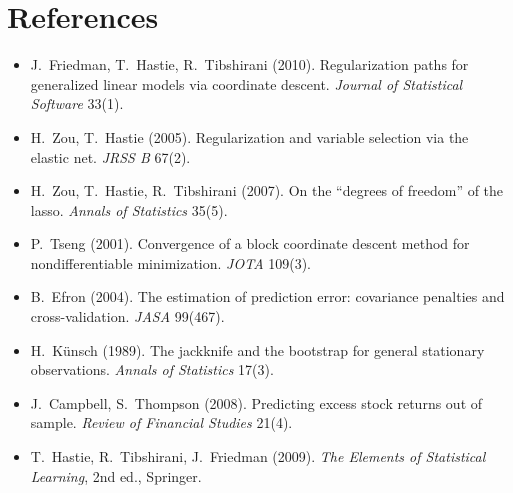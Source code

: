 \section*{References}
\begin{itemize}\small
  \item J.~Friedman, T.~Hastie, R.~Tibshirani (2010). Regularization paths for generalized linear
        models via coordinate descent. \emph{Journal of Statistical Software} 33(1).
  \item H.~Zou, T.~Hastie (2005). Regularization and variable selection via the elastic net.
        \emph{JRSS B} 67(2).
  \item H.~Zou, T.~Hastie, R.~Tibshirani (2007). On the ``degrees of freedom'' of the lasso.
        \emph{Annals of Statistics} 35(5).
  \item P.~Tseng (2001). Convergence of a block coordinate descent method for nondifferentiable
        minimization. \emph{JOTA} 109(3).
  \item B.~Efron (2004). The estimation of prediction error: covariance penalties and
        cross-validation. \emph{JASA} 99(467).
  \item H.~K\"unsch (1989). The jackknife and the bootstrap for general stationary observations.
        \emph{Annals of Statistics} 17(3).
  \item J.~Campbell, S.~Thompson (2008). Predicting excess stock returns out of sample.
        \emph{Review of Financial Studies} 21(4).
  \item T.~Hastie, R.~Tibshirani, J.~Friedman (2009). \emph{The Elements of Statistical Learning},
        2nd ed., Springer.
\end{itemize}
